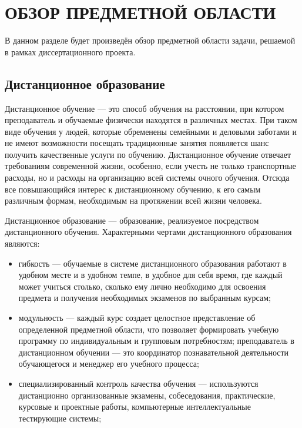 \section{ОБЗОР ПРЕДМЕТНОЙ ОБЛАСТИ}

В данном разделе будет произведён обзор предметной области задачи,
решаемой в рамках диссертационного проекта.

\subsection{Дистанционное образование}

Дистанционное обучение — это способ обучения на расстоянии, при котором преподаватель и
обучаемые физически находятся в различных местах. При таком виде обучения у людей, которые
обременены семейными и деловыми заботами и не имеют возможности посещать традиционные занятия
появляется шанс получить качественные услуги по обучению. Дистанционное обучение отвечает
требованиям современной жизни, особенно, если учесть не только транспортные расходы, но и
расходы на организацию всей системы очного обучения. Отсюда все повышающийся интерес к
дистанционному обучению, к его самым различным формам, необходимым на протяжении
всей жизни человека.\cite{moluch}

Дистанционное образование — образование, реализуемое посредством дистанционного обучения.
Характерными чертами дистанционного образования являются:

\begin{itemize}
  \item гибкость — обучаемые в системе дистанционного образования работают в удобном месте и в удобном темпе,
  в удобное для себя время, где каждый может учиться столько, сколько ему лично необходимо для
  освоения предмета и получения необходимых экзаменов по выбранным курсам;
  \item модульность — каждый курс создает целостное представление об определенной предметной области,
  что позволяет формировать учебную программу по индивидуальным и групповым потребностям; преподаватель в дистанционном обучении — это координатор познавательной деятельности
  обучающегося и менеджер его учебного процесса;
  \item специализированный контроль качества обучения —
  используются дистанционно организованные экзамены, собеседования, практические, курсовые и
  проектные работы, компьютерные интеллектуальные тестирующие системы;
\end{itemize}

